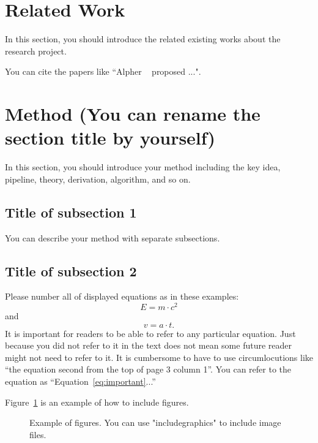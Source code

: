 \documentclass[10pt,twocolumn,letterpaper]{article}
\begin{document}
\section{Related Work}
\label{sec:related_work}
In this section, you should introduce the related existing works about the research project.

You can cite the papers like ``Alpher \etal~\cite{Alpher03} proposed ...".

\section{Method (You can rename the section title by yourself)}
\label{sec:method}
In this section, you should introduce your method including the key idea, pipeline, theory, derivation, algorithm, and so on.

\subsection{Title of subsection 1}
You can describe your method with separate subsections. 


\subsection{Title of subsection 2}

Please number all of displayed equations as in these examples:
\begin{equation}
  E = m\cdot c^2
  \label{eq:important}
\end{equation}
and
\begin{equation}
  v = a\cdot t.
  \label{eq:also-important}
\end{equation}
It is important for readers to be able to refer to any particular equation.
Just because you did not refer to it in the text does not mean some future reader might not need to refer to it.
It is cumbersome to have to use circumlocutions like ``the equation second from the top of page 3 column 1''. You can refer to the equation as ``Equation~\ref{eq:important}...''

Figure~\ref{fig:onecol} is an example of how to include figures.

\begin{figure}[t]
  \centering
  \fbox{\rule{0pt}{1.3in} \rule{0.9\linewidth}{0pt}}

   \caption{Example of figures. You can use "includegraphics" to include image files.}
   \label{fig:onecol}
\end{figure}
\end{document}
